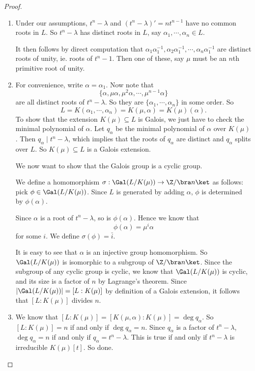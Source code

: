 \documentclass[a4paper]{article}
\begin{document}
\begin{proof}\leavevmode
  \begin{enumerate}
    \item Under our assumptions, $t^n - \lambda$ and $(t^n - \lambda)' = nt^{n - 1}$ have no common roots in $L$. So $t^n - \lambda$ has distinct roots in $L$, say $\alpha_1, \cdots, \alpha_n \in L$.

      It then follows by direct computation that $\alpha_1 \alpha_1^{-1}, \alpha_2 \alpha_1^{-1}, \cdots, \alpha_n \alpha_1^{-1}$ are distinct roots of unity, ie. roots of $t^n - 1$. Then one of these, say $\mu$ must be an $n$th primitive root of unity.
    \item For convenience, write $\alpha = \alpha_1$. Now note that
      \[
        \{\alpha, \mu\alpha, \mu^2 \alpha, \cdots, \mu^{n - 1} \alpha\}
      \]
      are all distinct roots of $t^n - \lambda$. So they are $\{\alpha_1, \cdots, \alpha_n\}$ in some order. So
      \[
        L = K(\alpha_1, \cdots, \alpha_n) = K(\mu, \alpha) = K(\mu)(\alpha).
      \]
      To show that the extension $K(\mu) \subseteq L$ is Galois, we just have to check the minimal polynomial of $\alpha$. Let $q_\alpha$ be the minimal polynomial of $\alpha$ over $K(\mu)$. Then $q_\alpha \mid t^n - \lambda$, which implies that the roots of $q_\alpha$ are distinct and $q_\alpha$ splits over $L$. So $K(\mu) \subseteq L$ is a Galois extension.

      We now want to show that the Galois group is a cyclic group.

      We define a homomorphism $\sigma: \Gal(L/K(\mu)) \to \Z/\bra n\ket$ as follows: pick $\phi \in \Gal(L/K(\mu))$. Since $L$ is generated by adding $\alpha$, $\phi$ is determined by $\phi(\alpha)$.

      Since $\alpha$ is a root of $t^{n} - \lambda$, so is $\phi(\alpha)$. Hence we know that
      \[
        \phi(\alpha) = \mu^i \alpha
      \]
      for some $i$. We define $\sigma(\phi) = \bar{i}$.

      It is easy to see that $\alpha$ is an injective group homomorphism. So $\Gal(L/K(\mu))$ is isomorphic to a subgroup of $\Z/\bra n\ket$. Since the subgroup of any cyclic group is cyclic, we know that $\Gal(L/K(\mu))$ is cyclic, and its size is a factor of $n$ by Lagrange's theorem. Since $|\Gal(L/K(\mu))| = [L:K(\mu)]$ by definition of a Galois extension, it follows that $[L:K(\mu)]$ divides $n$.

    \item We know that $[L:K(\mu)] = [K(\mu, \alpha): K(\mu)] = \deg q_\alpha$. So $[L:K(\mu)] = n$ if and only if $\deg q_\alpha = n$. Since $q_\alpha$ is a factor of $t^n - \lambda$, $\deg q_\alpha = n$ if and only if $q_\alpha = t^n - \lambda$. This is true if and only if $t^n - \lambda$ is irreducible $K(\mu)[t]$. So done.
  \end{enumerate}
\end{proof}
\end{document}
